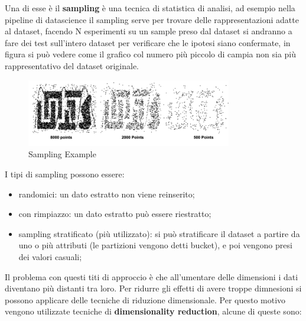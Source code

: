 \documentclass[12pt]{article}
\begin{document}
Una di esse \`e il \textbf{sampling} \`e una tecnica di statistica di analisi, ad esempio nella pipeline di datascience il sampling serve per trovare delle rappresentazioni adatte al dataset, facendo N esperimenti su un sample preso dal dataset si andranno a fare dei test sull'intero dataset per verificare che le ipotesi siano confermate, in figura si pu\`o vedere come il grafico col numero pi\`u piccolo di campia non sia pi\`u rappresentativo del dataset originale.
\begin{figure}[H]
    \centering
    \includegraphics[width=0.8\textwidth]{sampling-example.png}
    \caption{Sampling Example}
    \label{fig:sampling-example}
\end{figure}
I tipi di sampling possono essere:
\begin{itemize}
    \item randomici: un dato estratto non viene reinserito;
    \item con rimpiazzo: un dato estratto pu\`o essere riestratto;
    \item sampling stratificato (pi\`u utilizzato): si pu\`o stratificare il dataset a partire da uno o pi\`u attributi (le partizioni vengono detti bucket), e poi vengono presi dei valori casuali;
\end{itemize} 
Il problema con questi titi di approccio \`e che all'umentare delle dimensioni i dati diventano pi\`u distanti tra loro. Per ridurre gli effetti di avere troppe dimnesioni si possono applicare delle tecniche di riduzione dimensionale. Per questo motivo vengono utilizzate tecniche di \textbf{dimensionality reduction}, alcune di queste sono:
\end{document}

